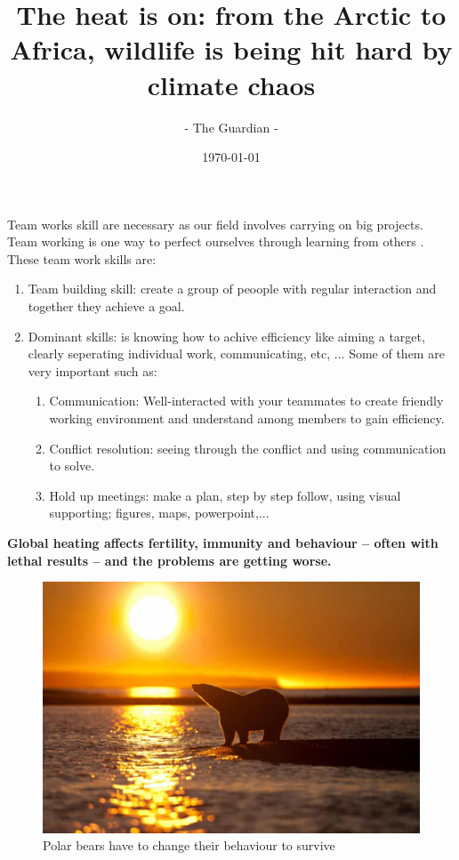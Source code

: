 \documentclass[12pt]{article}
\title{\LARGE\bf The heat is on: from the Arctic to Africa, wildlife is being hit hard by climate chaos}
\author{- The Guardian -}
\date{\today}
\begin{document}
Team works skill are necessary as our field involves carrying on big projects. Team working is one way to perfect ourselves through learning from others . 
 These team work skills are: 
 \begin{enumerate}
     \item Team building skill: create a group of peoople with regular interaction and together they achieve a goal.
     \item Dominant skills: is knowing how to achive efficiency like aiming a target, clearly seperating individual work, communicating, etc, ... Some of them are very important such as:
      \begin{enumerate}
         \item Communication: Well-interacted with your teammates to create friendly working environment and understand among members to gain efficiency.
         \item Conflict resolution: seeing through the conflict and using communication to solve.
         \item Hold up meetings: make a plan, step by step follow, using visual supporting; figures, maps, powerpoint,... 
     \end{enumerate}
\end{enumerate}
\newpage
\begin{center}
\begin{minipage}{0.8\textwidth}
\small\bf Global heating affects fertility, immunity and behaviour – often with lethal results – and the problems are getting worse.
\end{minipage}
\end{center}
\vspace{0.2cm}

\begin{figure}[h]
    \centering
    \includegraphics[scale=0.45]{graphic/polar bear.jpg}
    \caption{Polar bears have to change their behaviour to survive}
\end{figure}
\end{document}
